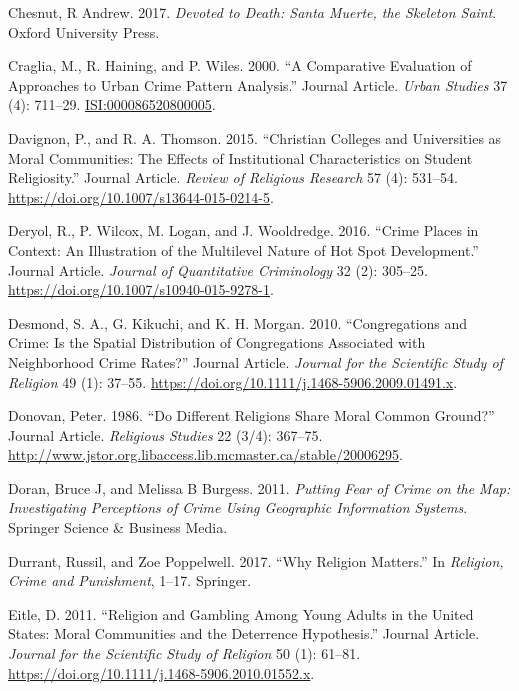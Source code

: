 \documentclass[smallextended]{svjour3}       %
\begin{document}
\leavevmode\hypertarget{ref-Chesnut2017devoted}{}%
Chesnut, R Andrew. 2017. \emph{Devoted to Death: Santa Muerte, the
Skeleton Saint}. Oxford University Press.

\leavevmode\hypertarget{ref-Craglia2000comparative}{}%
Craglia, M., R. Haining, and P. Wiles. 2000. ``A Comparative Evaluation
of Approaches to Urban Crime Pattern Analysis.'' Journal Article.
\emph{Urban Studies} 37 (4): 711--29. \url{ISI:000086520800005}.

\leavevmode\hypertarget{ref-Davignon2015christian}{}%
Davignon, P., and R. A. Thomson. 2015. ``Christian Colleges and
Universities as Moral Communities: The Effects of Institutional
Characteristics on Student Religiosity.'' Journal Article. \emph{Review
of Religious Research} 57 (4): 531--54.
\url{https://doi.org/10.1007/s13644-015-0214-5}.

\leavevmode\hypertarget{ref-Deryol2016crime}{}%
Deryol, R., P. Wilcox, M. Logan, and J. Wooldredge. 2016. ``Crime Places
in Context: An Illustration of the Multilevel Nature of Hot Spot
Development.'' Journal Article. \emph{Journal of Quantitative
Criminology} 32 (2): 305--25.
\url{https://doi.org/10.1007/s10940-015-9278-1}.

\leavevmode\hypertarget{ref-Desmond2010congregations}{}%
Desmond, S. A., G. Kikuchi, and K. H. Morgan. 2010. ``Congregations and
Crime: Is the Spatial Distribution of Congregations Associated with
Neighborhood Crime Rates?'' Journal Article. \emph{Journal for the
Scientific Study of Religion} 49 (1): 37--55.
\url{https://doi.org/10.1111/j.1468-5906.2009.01491.x}.

\leavevmode\hypertarget{ref-Donovan1986different}{}%
Donovan, Peter. 1986. ``Do Different Religions Share Moral Common
Ground?'' Journal Article. \emph{Religious Studies} 22 (3/4): 367--75.
\url{http://www.jstor.org.libaccess.lib.mcmaster.ca/stable/20006295}.

\leavevmode\hypertarget{ref-Doran2011putting}{}%
Doran, Bruce J, and Melissa B Burgess. 2011. \emph{Putting Fear of Crime
on the Map: Investigating Perceptions of Crime Using Geographic
Information Systems}. Springer Science \& Business Media.

\leavevmode\hypertarget{ref-Durrant2017religion}{}%
Durrant, Russil, and Zoe Poppelwell. 2017. ``Why Religion Matters.'' In
\emph{Religion, Crime and Punishment}, 1--17. Springer.

\leavevmode\hypertarget{ref-Eitle2011religion}{}%
Eitle, D. 2011. ``Religion and Gambling Among Young Adults in the United
States: Moral Communities and the Deterrence Hypothesis.'' Journal
Article. \emph{Journal for the Scientific Study of Religion} 50 (1):
61--81. \url{https://doi.org/10.1111/j.1468-5906.2010.01552.x}.
\end{document}
